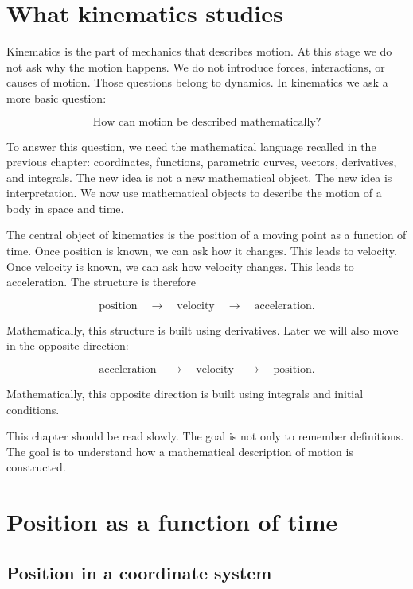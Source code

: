 \section{What kinematics studies}

Kinematics is the part of mechanics that describes motion. At this stage we do not ask why the motion happens. We do not introduce forces, interactions, or causes of motion. Those questions belong to dynamics. In kinematics we ask a more basic question:

\[
\text{How can motion be described mathematically?}
\]

To answer this question, we need the mathematical language recalled in the previous chapter: coordinates, functions, parametric curves, vectors, derivatives, and integrals. The new idea is not a new mathematical object. The new idea is interpretation. We now use mathematical objects to describe the motion of a body in space and time.

The central object of kinematics is the position of a moving point as a function of time. Once position is known, we can ask how it changes. This leads to velocity. Once velocity is known, we can ask how velocity changes. This leads to acceleration. The structure is therefore

\[
\text{position} \quad \longrightarrow \quad \text{velocity} \quad \longrightarrow \quad \text{acceleration}.
\]

Mathematically, this structure is built using derivatives. Later we will also move in the opposite direction:

\[
\text{acceleration} \quad \longrightarrow \quad \text{velocity} \quad \longrightarrow \quad \text{position}.
\]

Mathematically, this opposite direction is built using integrals and initial conditions.

This chapter should be read slowly. The goal is not only to remember definitions. The goal is to understand how a mathematical description of motion is constructed.

\section{Position as a function of time}

\subsection{Position in a coordinate system}

